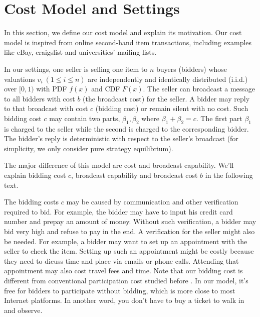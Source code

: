 \section{Cost Model and Settings}

In this section, we define our cost model and explain its motivation. Our
cost model is inspired from online second-hand item transactions, including
examples like eBay, craigslist and universities' mailing-lists.


\begin{definition}\label{def:model}

In our settings, one seller is selling one item to $n$ buyers (bidders)
whose valuations $v_i~(1 \leq i \leq n)$ are independently and identically
distributed (i.i.d.) over $[0, 1)$ with PDF $f(x)$ and CDF $F(x)$. The seller
can broadcast a message to all bidders with cost $b$ (the broadcast cost) for
the seller.  A bidder may reply to that broadcast with cost $c$ (bidding cost)
or remain silent with no cost. Such bidding cost $c$ may contain two parts,
$\beta_1, \beta_2$ where $\beta_1+\beta_2 = c$.  The first part $\beta_1$ is
charged to the seller while the second is charged to the corresponding bidder.
The bidder's reply is deterministic with respect to the seller's
broadcast (for simplicity, we only consider pure strategy equilibrium).

\end{definition}

The major difference of this model are cost and broadcast capability. We'll
explain bidding cost $c$, broadcast capability and broadcast cost $b$ in
the following text.

The bidding costs $c$ may be caused by communication and other verification
required to bid. For example, the bidder may have to input his credit card
number and prepay an amount of money. Without such verification, a bidder may
bid very high and refuse to pay in the end. A verification for the seller might
also be needed. For example, a bidder may want to set up an appointment with
the seller to check the item.  Setting up such an appointment might be costly
because they need to dicuss time and place via emails or phone calls.
Attending that appointment may also cost travel fees and time.  Note that our
bidding cost is different from conventional participation cost studied before
\cite{Stegeman95:ParticipationCost, Tan2006:EquilibriaParticipationCost}. In
our model, it's free for bidders to participate without bidding, which is more
close to most Internet platforms. In another word, you don't have to buy a
ticket to walk in and observe.

